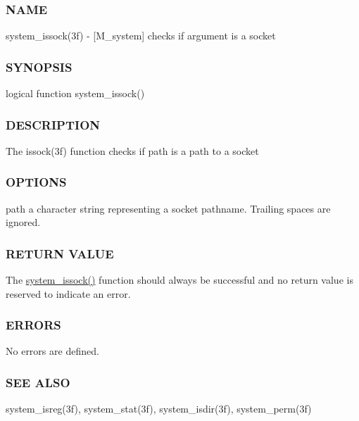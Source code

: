 \subsubsection*{N\+A\+ME}

system\+\_\+issock(3f) -\/ \mbox{[}M\+\_\+system\mbox{]} checks if argument is a socket 

\subsubsection*{S\+Y\+N\+O\+P\+S\+IS}

\begin{DoxyVerb}logical function system_issock()
\end{DoxyVerb}


\subsubsection*{D\+E\+S\+C\+R\+I\+P\+T\+I\+ON}

The issock(3f) function checks if path is a path to a socket

\subsubsection*{O\+P\+T\+I\+O\+NS}

path a character string representing a socket pathname. Trailing spaces are ignored.

\subsubsection*{R\+E\+T\+U\+RN V\+A\+L\+UE}

The \hyperlink{namespacem__system_af6eb5074fe74552bc7a5e7d00f459087}{system\+\_\+issock()} function should always be successful and no return value is reserved to indicate an error.

\subsubsection*{E\+R\+R\+O\+RS}

No errors are defined.

\subsubsection*{S\+EE A\+L\+SO}

system\+\_\+isreg(3f), system\+\_\+stat(3f), system\+\_\+isdir(3f), system\+\_\+perm(3f)

